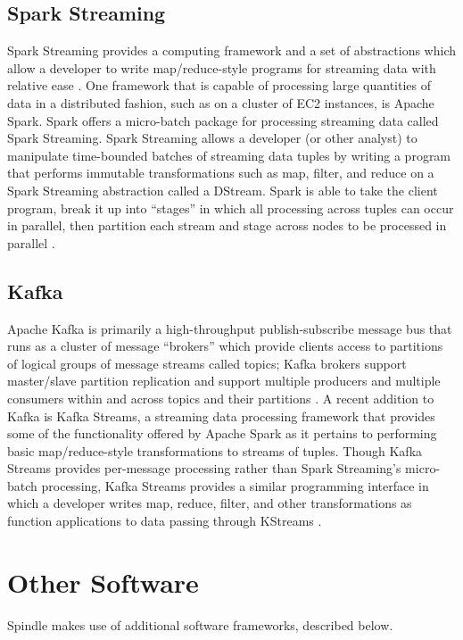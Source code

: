 \documentclass{thesis}
\begin{document}
    \subsection{Spark Streaming}
        Spark Streaming provides a computing framework and a set of abstractions which allow
        a developer to write map/reduce-style programs for streaming data with relative ease \cite{spark:streaming}.
        One framework that is capable of processing large quantities of data in a distributed fashion,
        such as on a cluster of EC2 instances, is Apache Spark. Spark offers a micro-batch package for
        processing streaming data called Spark Streaming. Spark Streaming allows a developer (or other
        analyst) to manipulate time-bounded batches of streaming data tuples by writing a program that
        performs immutable transformations such as map, filter, and reduce on a Spark Streaming abstraction
        called a DStream. Spark is able to take the client program, break it up into ``stages'' in which
        all processing across tuples can occur in parallel, then partition each stream and stage
        across nodes to be processed in parallel %
        \cite{spark:streaming}.

    \subsection{Kafka}
        Apache Kafka is primarily a high-throughput publish-subscribe message bus that runs as a cluster
        of message ``brokers'' which provide clients access to partitions of logical groups of message streams
        called topics; Kafka brokers support master/slave partition replication and support multiple
        producers and multiple consumers within and across topics and their partitions \cite{kafka}.
        A recent addition to Kafka is Kafka Streams, a streaming data processing framework that
        provides some of the functionality offered by Apache Spark as it pertains to performing basic
        map/reduce-style transformations to streams of tuples. Though Kafka Streams provides per-message
        processing rather than Spark Streaming's micro-batch processing, Kafka Streams provides a similar
        programming interface in which a developer writes map, reduce, filter, and other
        transformations as function applications to data passing through KStreams \cite{kafka:streams}.
    \section{Other Software}
        Spindle makes use of additional software frameworks, described below.
\end{document}
